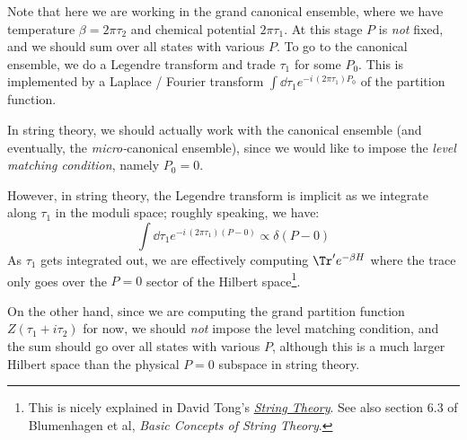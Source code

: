 \documentclass[a4paper,10pt]{article}
\begin{document}
\begin{enumerate}
\begin{enumerate}
	Note that here we are working in the grand canonical ensemble, where we have temperature $\beta = 2\pi\tau_2$ and chemical potential $2\pi\tau_1$. At this stage $P$ is \textit{not} fixed, and we should sum over all states with various $P$. To go to the canonical ensemble, we do a Legendre transform and trade $\tau_1$ for some $P_0$. This is implemented by a Laplace / Fourier transform $\int \dd{\tau_1} e^{-i\,(2\pi\tau_1) P_0}$ of the partition function. 
	
	In string theory, we should actually work with the canonical ensemble (and eventually, the \textit{micro-}canonical ensemble), since we would like to impose the \textit{level matching condition}, namely $P_0 = 0$. 
	
	However, in string theory, the Legendre transform is implicit as we integrate along $\tau_1$ in the moduli space; roughly speaking, we have:
	\begin{equation}
		\int \dd{\tau_1} e^{-i\,(2\pi\tau_1) (P - 0)}
		\propto \delta(P - 0)
	\end{equation}
	As $\tau_1$ gets integrated out, we are effectively computing $\Tr' e^{-\beta H}$ where the trace only goes over the $P = 0$ sector of the Hilbert space\footnote{
		This is nicely explained in David Tong's \href{https://www.damtp.cam.ac.uk/user/tong/string.html}{\textit{String Theory}}. See also section 6.3 of Blumenhagen et al, \textit{Basic Concepts of String Theory}. 
	}. 
	
	On the other hand, since we are computing the grand partition function $Z(\tau_1 + i\tau_2)$ for now, we should \textit{not} impose the level matching condition, and the sum should go over all states with various $P$, although this is a much larger Hilbert space than the physical $P = 0$ subspace in string theory. 
	

\end{enumerate}
\end{enumerate}
\end{document}
